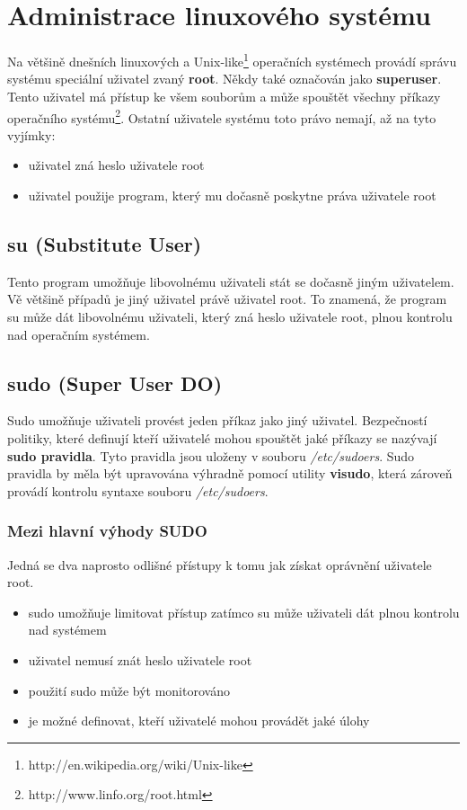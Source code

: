 \documentclass[10pt,a4paper,notitlepage]{article}
\begin{document}
\section{Administrace linuxového systému}
Na většině dnešních linuxových a
Unix-like\footnote{http://en.wikipedia.org/wiki/Unix-like} operačních systémech
provádí správu systému speciální uživatel zvaný \textbf{root}. Někdy také
označován jako \textbf{superuser}. Tento uživatel má přístup ke všem souborům a
může spouštět všechny příkazy operačního
systému\footnote{http://www.linfo.org/root.html}.  Ostatní uživatele systému
toto právo nemají, až na tyto vyjímky: \begin{itemize}
	\item uživatel zná heslo uživatele root
	\item uživatel použije program, který mu dočasně poskytne práva uživatele root
\end{itemize}


\subsection{su (Substitute User)}
Tento program umožňuje libovolnému uživateli stát se dočasně jiným uživatelem.
Vě většině případů je jiný uživatel právě uživatel root. To znamená, že program
su může dát libovolnému uživateli, který zná heslo uživatele root, plnou
kontrolu nad operačním systémem.


\subsection{sudo (Super User DO)}
Sudo umožňuje uživateli provést jeden příkaz jako jiný uživatel. Bezpečností
politiky, které definují kteří uživatelé mohou spouštět jaké příkazy se nazývají 
\textbf{sudo pravidla}. Tyto pravidla jsou uloženy v souboru
\emph{/etc/sudoers}. Sudo pravidla by měla být upravována výhradně pomocí
utility \textbf{visudo}, která zároveň provádí kontrolu syntaxe souboru
\emph{/etc/sudoers}.

\subsubsection{Mezi hlavní výhody SUDO}
Jedná se dva naprosto odlišné přístupy k tomu jak získat oprávnění uživatele
root.

\begin{itemize}
	\item sudo umožňuje limitovat přístup zatímco su může uživateli dát plnou
		kontrolu nad systémem
	\item uživatel nemusí znát heslo uživatele root
	\item použití sudo může být monitorováno
	\item je možné definovat, kteří uživatelé mohou provádět jaké úlohy
\end{itemize}
\end{document}
